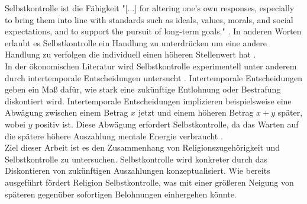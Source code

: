 \documentclass[11pt,a4paper]{article}
\begin{document}

Selbstkontrolle ist die Fähigkeit "[...] for altering one's own responses, especially to bring them into line with standards such as ideals, values, morals, and social expectations, and to support the pursuit of long-term goals." \parencite{baumeister2007strength}. In anderen Worten erlaubt es Selbstkontrolle ein Handlung zu unterdrücken um eine andere Handlung zu verfolgen die individuell einen höheren Stellenwert hat \parencite{mccullough2013religion}.\\

In der ökonomischen Literatur wird Selbstkontrolle experimentell unter anderem durch intertemporale Entscheidungen untersucht \parencite{thaler1991some}. Intertemporale Entscheidungen geben ein Maß dafür, wie stark eine zukünftige Entlohnung oder Bestrafung diskontiert wird. Intertemporale Entscheidungen implizieren beispielsweise eine Abwägung zwischen einem Betrag $x$ jetzt und einem höheren Betrag $x+y$ später, wobei $y$ positiv ist. Diese Abwägung erfordert Selbstkontrolle, da das Warten auf die spätere höhere Auszahlung mentale Energie verbraucht \parencite{thaler1991some}.\\

Ziel dieser Arbeit ist es den Zusammenhang von Religionszugehörigkeit und Selbstkontrolle zu untersuchen. Selbstkontrolle wird konkreter durch das Diskontieren von zukünftigen Auszahlungen konzeptualisiert. Wie bereits ausgeführt fördert Religion Selbstkontrolle, was mit einer größeren Neigung von späteren gegenüber sofortigen Belohnungen einhergehen könnte. %
 
\end{document}
